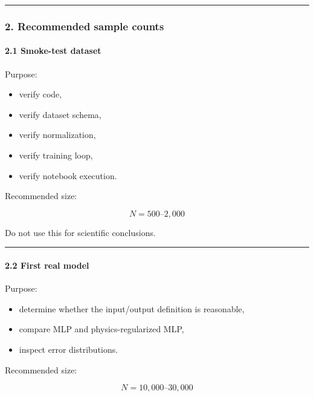 \documentclass[
]{article}
\providecommand{\tightlist}{%
  \setlength{\itemsep}{0pt}\setlength{\parskip}{0pt}}
\begin{document}
\begin{center}\rule{0.5\linewidth}{0.5pt}\end{center}

\hypertarget{recommended-sample-counts}{%
\subsubsection{2. Recommended sample
counts}\label{recommended-sample-counts}}

\hypertarget{smoke-test-dataset}{%
\paragraph{2.1 Smoke-test dataset}\label{smoke-test-dataset}}

Purpose:

\begin{itemize}
\tightlist
\item
  verify code,
\item
  verify dataset schema,
\item
  verify normalization,
\item
  verify training loop,
\item
  verify notebook execution.
\end{itemize}

Recommended size:

\[
N = 500\text{--}2{,}000
\]

Do not use this for scientific conclusions.

\begin{center}\rule{0.5\linewidth}{0.5pt}\end{center}

\hypertarget{first-real-model}{%
\paragraph{2.2 First real model}\label{first-real-model}}

Purpose:

\begin{itemize}
\tightlist
\item
  determine whether the input/output definition is reasonable,
\item
  compare MLP and physics-regularized MLP,
\item
  inspect error distributions.
\end{itemize}

Recommended size:

\[
N = 10{,}000\text{--}30{,}000
\]
\end{document}
